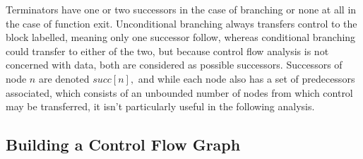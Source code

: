 \documentclass{article}
\begin{document}
Terminators have one or two successors in the case of branching or none at all in the case of function exit. %
Unconditional branching always transfers control to the block labelled, meaning only one successor follow, whereas conditional branching could transfer to either of the two, but because control flow analysis is not concerned with data, both are considered as possible successors. %
Successors of node \(n\) are denoted \( \mathit{succ}[n], \)
and while each node also has a set of predecessors associated, which consists of an  unbounded number of nodes from which control may be transferred, it isn't particularly useful in the following analysis.













\subsection{Building a Control Flow Graph}

\end{document}
